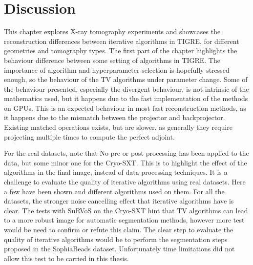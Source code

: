 \section{Discussion}
This chapter explores X-ray tomography experiments and showcases the reconstruction differences between iterative algorithms in TIGRE, for different geometries and tomography types. The first part of the chapter highlights the behaviour difference between some setting of algorithms in TIGRE. The importance of algorithm and hyperparameter selection is hopefully stressed enough, so the behaviour of the TV algorithms under parameter change. Some of the behaviour presented, especially the divergent behaviour, is not intrinsic of the mathematics used, but it happens due to the fast implementation of the methods on GPUs. This is an expected behaviour in most fast reconstruction methods, as it happens due to the mismatch between the projector and backprojector. Existing matched operations exists, but are slower, as generally they require projecting multiple times to compute the perfect adjoint. 

For the real datasets, note that No pre or post processing has been applied to the data, but some minor one for the Cryo-SXT. This is to highlight the effect of the algorithms in the final image, instead of data processing techniques. It is a challenge to evaluate the quality of iterative algorithms using real datasets. Here a few have been shown and different algorithms used on them. For all the datasets, the stronger noise cancelling effect that iterative algorithms have is clear. The tests with SuRVoS on the Cryo-SXT hint that TV algorithms can lead to a more robust image for automatic segmentation methods, however more test would be need to confirm or refute this claim. The clear step to evaluate the quality of iterative algorithms would be to perform the segmentation steps proposed in the SophiaBeads dataset. Unfortunately time limitations did not allow this test to be carried in this thesis. 
